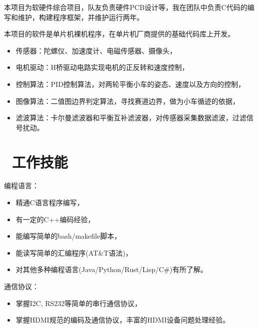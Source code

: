 \documentclass{resume}
\begin{document}
\hspace*{\fill}
本项目为软硬件综合项目，队友负责硬件PCB设计等，我在团队中负责C代码的编写和维护，构建程序框架，并维护运行两年。

本项目的软件是单片机裸机程序，在单片机厂商提供的基础代码库上开发。
\begin{itemize}
  \item 传感器：陀螺仪、加速度计、电磁传感器、摄像头，
  \item 电机驱动：H桥驱动电路实现电机的正反转和速度控制，
  \item 控制算法：PID控制算法，对两轮平衡小车的姿态、速度以及方向的控制，
  \item 图像算法：二值图边界判定算法，寻找赛道边界，做为小车循迹的依据，
  \item 滤波算法：卡尔曼滤波器和平衡互补滤波器，对传感器采集数据滤波，过滤信号扰动。
\end{itemize}


\hspace*{\fill}
\section{\faCogs\ 工作技能}
编程语言：
\begin{itemize}[parsep=0.5ex]
  \item 精通C语言程序编写，
  \item 有一定的C++编码经验，
  \item 能编写简单的bash/makefile脚本，
  \item 能读写简单的汇编程序(AT\&T语法)，
  \item 对其他多种编程语言(Java/Python/Rust/Lisp/C\#)有所了解。
\end{itemize}

通信协议：
\begin{itemize}
  \item 掌握I2C, RS232等简单的串行通信协议，
  \item 掌握HDMI规范的编码及通信协议，丰富的HDMI设备问题处理经验。
\end{itemize}
\end{document}
